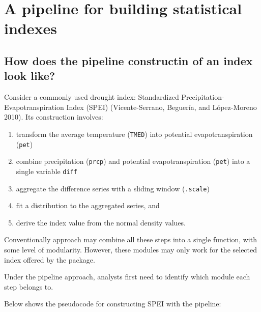 \documentclass[
]{article}
\providecommand{\tightlist}{%
  \setlength{\itemsep}{0pt}\setlength{\parskip}{0pt}}\usepackage{longtable,booktabs,array}
\begin{document}
\hypertarget{sec-a-pipeline-for-building-statistical-indexes}{%
\section{A pipeline for building statistical
indexes}\label{sec-a-pipeline-for-building-statistical-indexes}}

\hypertarget{sec-toy-example}{%
\subsection{How does the pipeline constructin of an index look
like?}\label{sec-toy-example}}

Consider a commonly used drought index: Standardized
Precipitation-Evapotranspiration Index (SPEI) (Vicente-Serrano,
Beguería, and López-Moreno 2010). Its construction involves:

\begin{enumerate}
\def\labelenumi{\arabic{enumi})}
\tightlist
\item
  transform the average temperature (\texttt{TMED}) into potential
  evapotranspiration (\texttt{pet})
\item
  combine precipitation (\texttt{prcp}) and potential evapotranspiration
  (\texttt{pet}) into a single variable \texttt{diff}
\item
  aggregate the difference series with a sliding window
  (\texttt{.scale})
\item
  fit a distribution to the aggregated series, and
\item
  derive the index value from the normal density values.
\end{enumerate}

Conventionally approach may combine all these steps into a single
function, with some level of modularity. However, these modules may only
work for the selected index offered by the package.

Under the pipeline approach, analysts first need to identify which
module each step belongs to.

Below shows the pseudocode for constructing SPEI with the pipeline:
\end{document}
